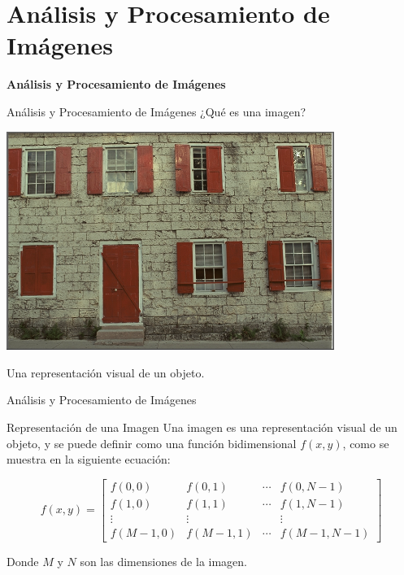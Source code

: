 \documentclass{beamer}
\begin{document}
\section{Análisis y Procesamiento de Imágenes}
\begin{frame}
    \begin{center}
        {\LARGE\bf Análisis y Procesamiento de Imágenes}
    \end{center}
\end{frame}

\begin{frame}{Análisis y Procesamiento de Imágenes}
    ¿Qué es una imagen?
    \pause
    \begin{center}
        \includegraphics[width=0.8\textwidth]{1.png}
    \end{center}
    \pause
    Una representación visual de un objeto.
\end{frame}

\begin{frame}{Análisis y Procesamiento de Imágenes}
    \begin{block}{Representación de una Imagen}
        Una imagen es una representaci\'on visual de un objeto, y se puede definir como una funci\'on bidimensional $f(x,y)$, como se muestra en la siguiente ecuaci\'on:

        $$
        f(x, y)=\left[\begin{array}{cccc}
        f(0,0) & f(0,1) & \cdots & f(0, N-1) \\
        f(1,0) & f(1,1) & \cdots & f(1, N-1) \\
        \vdots & \vdots & & \vdots \\
        f(M-1,0) & f(M-1,1) & \cdots & f(M-1, N-1)
        \end{array}\right]
        $$

        Donde $M$ y $N$ son las dimensiones de la imagen.
    \end{block}
\end{frame}
\end{document}
